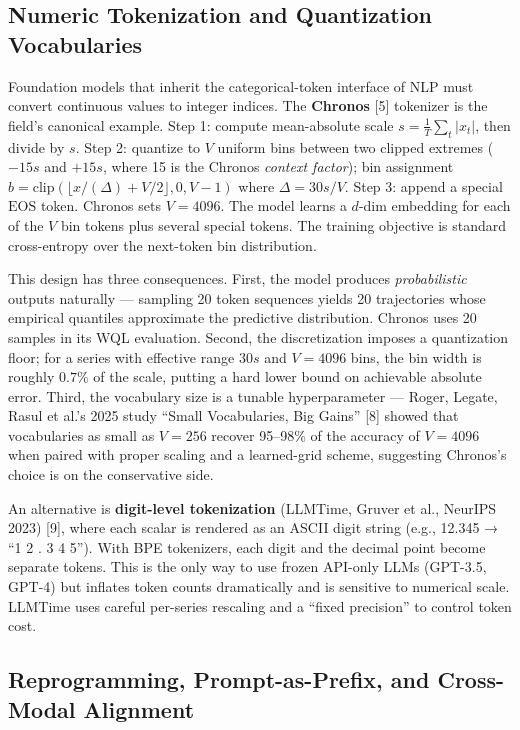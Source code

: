 \subsection{Numeric Tokenization and Quantization Vocabularies}\label{numeric-tokenization-and-quantization-vocabularies}

Foundation models that inherit the categorical-token interface of NLP must convert continuous values to integer indices. The \textbf{Chronos} {[}5{]} tokenizer is the field's canonical example. Step 1: compute mean-absolute scale \(s = \frac{1}{T}\sum_t |x_t|\), then divide by \(s\). Step 2: quantize to \(V\) uniform bins between two clipped extremes (\(-15s\) and \(+15s\), where 15 is the Chronos \emph{context factor}); bin assignment \(b = \mathrm{clip}(\lfloor x/(\Delta) + V/2 \rfloor, 0, V-1)\) where \(\Delta = 30s/V\). Step 3: append a special \(\mathrm{EOS}\) token. Chronos sets \(V = 4096\). The model learns a \(d\)-dim embedding for each of the \(V\) bin tokens plus several special tokens. The training objective is standard cross-entropy over the next-token bin distribution.

This design has three consequences. First, the model produces \emph{probabilistic} outputs naturally --- sampling 20 token sequences yields 20 trajectories whose empirical quantiles approximate the predictive distribution. Chronos uses 20 samples in its WQL evaluation. Second, the discretization imposes a quantization floor; for a series with effective range \(30s\) and \(V=4096\) bins, the bin width is roughly \(0.7\%\) of the scale, putting a hard lower bound on achievable absolute error. Third, the vocabulary size is a tunable hyperparameter --- Roger, Legate, Rasul et al.'s 2025 study ``Small Vocabularies, Big Gains'' {[}8{]} showed that vocabularies as small as \(V=256\) recover 95--98\% of the accuracy of \(V=4096\) when paired with proper scaling and a learned-grid scheme, suggesting Chronos's choice is on the conservative side.

An alternative is \textbf{digit-level tokenization} (LLMTime, Gruver et al., NeurIPS 2023) {[}9{]}, where each scalar is rendered as an ASCII digit string (e.g., 12.345 → ``1 2 . 3 4 5''). With BPE tokenizers, each digit and the decimal point become separate tokens. This is the only way to use frozen API-only LLMs (GPT-3.5, GPT-4) but inflates token counts dramatically and is sensitive to numerical scale. LLMTime uses careful per-series rescaling and a ``fixed precision'' to control token cost.

\subsection{Reprogramming, Prompt-as-Prefix, and Cross-Modal Alignment}\label{reprogramming-prompt-as-prefix-and-cross-modal-alignment}

